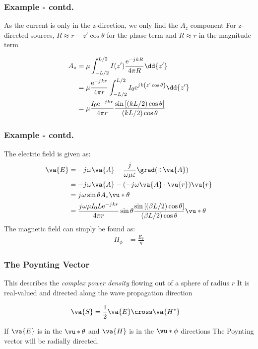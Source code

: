 \documentclass[10pt, compress]{beamer}
\renewcommand{\O}{\omega}  %
\newcommand{\E}{\varepsilon}  %
\renewcommand{\u}{\mu}  %
\newcommand{\e}{\mathrm{e}} %
\renewcommand{\j}{{j}\mkern1mu} %
\begin{document}
\begin{frame}
  \frametitle{Example - contd.}
  \begin{outline}
    \1 As the current is only in the z-direction, we only find the $A_z$ component
    \1 For z-directed sources, $R \approx r - z' \cos \theta$ for the phase term and $R \approx r$ in the magnitude term
  \end{outline}
\begin{align*}
  A_z &= \u \int_{-L/2}^{L/2} I(z') \frac{\e^{-\j k R}}{4 \pi R} \dd{z'} \\
  &= \u \frac{\e^{-\j k r}}{4 \pi r} \int_{-L/2}^{L/2} I_0 \e^{\j k \left(z' \cos \theta\right)} \dd{z'} \\
  &= \u \frac{I_0 \e^{-\j k r}}{4 \pi r} \frac{\sin \left[(kL/2)\cos \theta\right]}{(kL/2)\cos \theta}
\end{align*}
\end{frame}

\begin{frame}
  \frametitle{Example - contd.}
   The electric field is given as:
\begin{align*}
  \va{E} &= - \j \O \va{A} - \frac{\j}{\O \u \E} \grad(\div \va{A}) \\
  &= - \j \O \va{A} - (- \j \O \va{A} \cdot \vu{r})\vu{r} \\
  &= \j \O \sin \theta A_z \vu*{\theta} \\
  &= \frac{\j \O \u I_{0} L \e^{-\j k r}}{4 \pi r} \sin \theta \frac{\sin \left[(\beta L / 2) \cos \theta\right]}{(\beta L / 2) \cos \theta} \vu*{\theta}
\end{align*}
The magnetic field can simply be found as:
\begin{align*}
  H_{\phi} &= \frac{E_{\theta}}{\eta}
\end{align*}
\end{frame}

\begin{frame}
  \frametitle{The Poynting Vector}
  \begin{outline}
    \1 This describes the \textit{complex power density} flowing out of a sphere of radius $r$
    \1 It is real-valued and directed along the wave propagation direction
  \end{outline}
  \begin{align*}
    \va{S} &= \frac{1}{2} \va{E} \cross \va{H^{*}}
  \end{align*}
  \begin{outline}
    \1 If $\va{E}$ is in the $\vu*{\theta}$ and $\va{H}$ is in the $\vu*{\phi}$ directions
    \1 The Poynting vector will be radially directed.
  \end{outline}
\end{frame}
\end{document}
